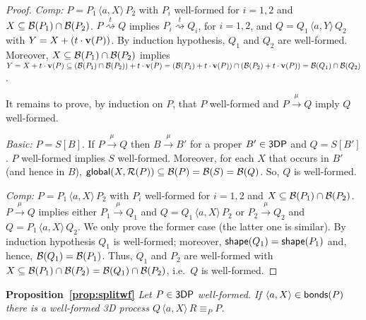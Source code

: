 \documentclass[11pt]{article}
\newcommand{\bonds}{{\sf bonds}}
\newcommand{\reference}{{\sf global}}
\newcommand{\proc}{\sf{3DP}}
\newcommand{\unionc}[1]{\,\langle #1 \rangle\,}
\newcommand{\nar}[1]{\xrightarrow{#1}}
\newcommand{\wnar}[1]{\stackrel{#1}{\rightsquigarrow}}
\newcommand{\shape}{{\sf shape}}
\newcommand{\boundary}[1]{\ensuremath{{\cal B}(#1)}}
\newcommand{\velocity}[1]{{\bf v}(#1)}
\newcommand{\referencepoint}[1]{\ensuremath{{\cal R}(#1)}}
\begin{document}
\begin{proof}
\par\medskip\noindent
{\em Comp:} $ P = P_1 \unionc{a,X} P_2$ with $P_i$ well-formed for $i=1,2$ and $X
\subseteq \boundary{P_1} \cap \boundary{P_2}$.
$P \wnar{t} Q$ implies $P_i \wnar{t} Q_i$, for $i=1,2$, and $Q= Q_1 \unionc{a, Y} Q_2$ with
$Y = X + (t \cdot \velocity{P})$. By induction hypothesis, $Q_1$ and $Q_2$ are well-formed.
Moreover, $X \subseteq \boundary{P_1} \cap \boundary{P_2}$ implies $Y = X + t \cdot
\velocity{P} \subseteq (\boundary{P_1} \cap \boundary{P_2}) + t \cdot \velocity{P} =
(\boundary{P_1} + t \cdot \velocity{P}) \cap (\boundary{P_2} + t \cdot \velocity{P}) =
\boundary{Q_1} \cap \boundary{Q_2}$.

\par\medskip\noindent
It remains to prove, by induction on $P$, that $P$ well-formed and $P \nar{\mu} Q$ imply $Q$ well-formed. 

\par\medskip\noindent
{\em Basic:} $P = S[B]$.
If $P \nar{\mu} Q$ then $B \nar{\mu} B'$ for a proper $B' \in \proc$ and $Q= S[B']$. $P$ well-formed
implies $S$ well-formed. Moreover, for each $X$ that occurs in $B'$ (and hence in $B$),
$\reference(X, \referencepoint{P}) \subseteq \boundary{P} = \boundary{S} = \boundary{Q}$. So, $Q$
is well-formed.
\par\medskip\noindent
{\em Comp:} $ P = P_1 \unionc{a,X} P_2$ with $P_i$ well-formed for $i=1,2$ and $X
\subseteq \boundary{P_1} \cap \boundary{P_2}$.
$P \nar{\mu} Q$ implies either $P_1 \nar{\mu} Q_1$ and $Q= Q_1 \unionc{a,X} P_2$ or $P_2
\nar{\mu} Q_2$ and $Q= P_1 \unionc{a,X} Q_2$. We only prove the former case (the latter one is
similar). By induction hypothesis $Q_1$ is well-formed; moreover, $\shape(Q_1) = \shape(P_1)$ and,
hence, $\boundary{Q_1} = \boundary{P_1}$.
Thus, $Q_1$ and $P_2$ are well-formed with $X \subseteq \boundary{P_1} \cap
\boundary{P_2} = \boundary{Q_1} \cap \boundary{P_2}$, i.e.\ $Q$ is well-formed.
\end{proof}
\par\medskip\noindent
{\bf Proposition~\ref{prop:splitwf}}
\em Let $P \in \proc$ well-formed. If $\langle a, X \rangle \in \bonds(P)$ there is a well-formed 3D
process $Q \unionc{a, X} R \equiv_P P$.\rm
\end{document}
